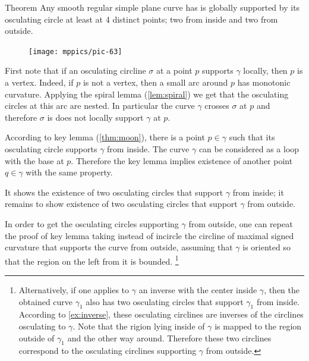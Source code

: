 \begin{thm}{Theorem}\label{thm:4-vert-supporting}
Any smooth regular simple plane curve has is globally supported by its osculating circle at least at 4 distinct points; two from inside and two from outside.
\end{thm}

{

\begin{figure}
\vskip-2mm
\centering
\texttt{[image: mppics/pic-63]}
\vskip0mm
\end{figure}

First note that if an osculating circline $\sigma$ at a point $p$ supports $\gamma$ locally, then $p$ is a vertex.
Indeed, if $p$ is not a vertex, then a small arc around $p$ has monotonic curvature.
Applying the spiral lemma (\ref{lem:spiral}) we get that the osculating circles at this arc are nested.
In particular the curve $\gamma$ crosses $\sigma$ at $p$ and therefore $\sigma$ is does not locally support $\gamma$ at $p$.
\qeds

}

According to key lemma (\ref{thm:moon}), there is a point $p\in\gamma$ such that its osculating circle supports $\gamma$ from inside.
The curve $\gamma$ can be considered as a loop with the base at $p$.
Therefore the key lemma implies existence of another point $q\in\gamma$ with the same property.

It shows the existence of two osculating circles that support $\gamma$ from inside;
it remains to show existence of two osculating circles that support $\gamma$ from outside.

In order to get the osculating circles supporting $\gamma$ from outside, one can repeat the proof of key lemma taking instead of incircle the circline of maximal signed curvature that supports the curve from outside, assuming that $\gamma$ is oriented so that the region on the left from it is bounded.%
\footnote{Alternatively, if one applies to $\gamma$ an inverse with the center inside $\gamma$, then the obtained curve $\gamma_1$ also has  two osculating circles that support $\gamma_1$ from inside.
According to \ref{ex:inverse}, these osculating circlines are inverses of the circlines osculating to $\gamma$.
Note that the rigion lying inside of $\gamma$ is mapped to the region outside of $\gamma_1$ and the other way around.
Therefore these two circlines correspond to the osculating circlines supporting $\gamma$ from outside.}
\qeds

